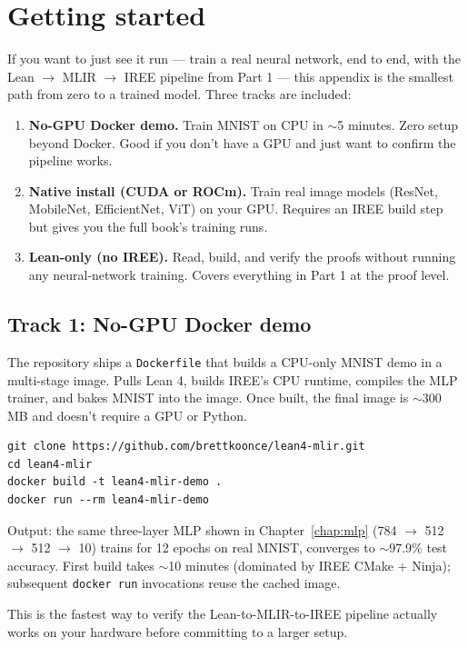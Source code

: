 \chapter{Getting started}
\label{app:getting_started}

If you want to just see it run --- train a real neural network, end
to end, with the Lean $\to$ MLIR $\to$ IREE pipeline from Part 1 --- this
appendix is the smallest path from zero to a trained model. Three
tracks are included:

\begin{enumerate}
  \item \textbf{No-GPU Docker demo.} Train MNIST on CPU in $\sim$5
    minutes. Zero setup beyond Docker. Good if you don't have a GPU
    and just want to confirm the pipeline works.
  \item \textbf{Native install (CUDA or ROCm).} Train real image
    models (ResNet, MobileNet, EfficientNet, ViT) on your GPU.
    Requires an IREE build step but gives you the full book's
    training runs.
  \item \textbf{Lean-only (no IREE).} Read, build, and verify the
    proofs without running any neural-network training. Covers
    everything in Part 1 at the proof level.
\end{enumerate}

\section*{Track 1: No-GPU Docker demo}

The repository ships a \texttt{Dockerfile} that builds a CPU-only
MNIST demo in a multi-stage image. Pulls Lean 4, builds IREE's CPU
runtime, compiles the MLP trainer, and bakes MNIST into the image.
Once built, the final image is $\sim$300 MB and doesn't require a
GPU or Python.

\begin{verbatim}
git clone https://github.com/brettkoonce/lean4-mlir.git
cd lean4-mlir
docker build -t lean4-mlir-demo .
docker run --rm lean4-mlir-demo
\end{verbatim}

Output: the same three-layer MLP shown in Chapter~\ref{chap:mlp}
(784 $\to$ 512 $\to$ 512 $\to$ 10) trains for 12 epochs on real
MNIST, converges to $\sim$97.9\% test accuracy. First build takes
$\sim$10 minutes (dominated by IREE CMake + Ninja); subsequent
\texttt{docker run} invocations reuse the cached image.

This is the fastest way to verify the Lean-to-MLIR-to-IREE pipeline
actually works on your hardware before committing to a larger setup.


